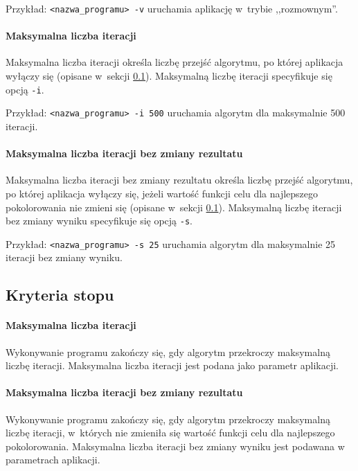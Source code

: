 Przykład: \verb+<nazwa_programu> -v+ uruchamia aplikację w~trybie ,,rozmownym''.

\paragraph{Maksymalna liczba iteracji}

Maksymalna liczba iteracji określa liczbę przejść algorytmu, po której aplikacja wyłączy się (opisane w~sekcji \ref{sec:stop_criteria}). Maksymalną liczbę iteracji specyfikuje się opcją \verb+-i+.

Przykład: \verb+<nazwa_programu> -i 500+ uruchamia algorytm dla maksymalnie 500 iteracji.

\paragraph{Maksymalna liczba iteracji bez zmiany rezultatu}

Maksymalna liczba iteracji bez zmiany rezultatu określa liczbę przejść algorytmu, po której aplikacja wyłączy się, jeżeli wartość funkcji celu dla najlepszego pokolorowania nie zmieni się (opisane w~sekcji \ref{sec:stop_criteria}). Maksymalną liczbę iteracji bez zmiany wyniku specyfikuje się opcją \verb+-s+.

Przykład: \verb+<nazwa_programu> -s 25+ uruchamia algorytm dla maksymalnie 25 iteracji bez zmiany wyniku.

\subsection{Kryteria stopu}
\label{sec:stop_criteria}

\paragraph{Maksymalna liczba iteracji}

Wykonywanie programu zakończy się, gdy algorytm przekroczy maksymalną liczbę iteracji. Maksymalna liczba iteracji jest podana jako parametr aplikacji.

\paragraph{Maksymalna liczba iteracji bez zmiany rezultatu}

Wykonywanie programu zakończy się, gdy algorytm przekroczy maksymalną liczbę iteracji, w~których nie zmieniła się wartość funkcji celu dla najlepszego pokolorowania. Maksymalna liczba iteracji bez zmiany wyniku jest podawana w parametrach aplikacji.

